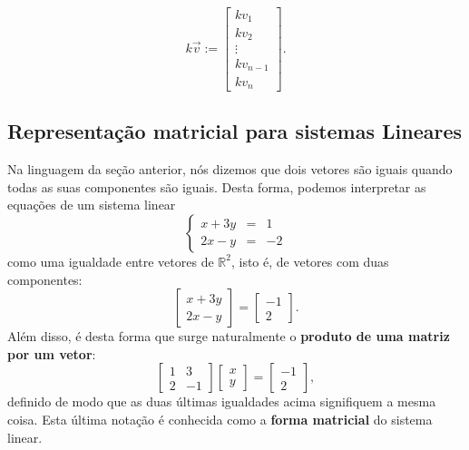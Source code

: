 \begin{equation}
k \vec{v} :=
\left[
  \begin{array}{c}
    k v_1 \\
    k v_2 \\
    \vdots \\
    k v_{n-1} \\
    k v_n
  \end{array}
\right].
\end{equation}



\subsection{Representação matricial para sistemas Lineares}

Na linguagem da seção anterior, nós dizemos que dois vetores são iguais quando todas as suas componentes são iguais. Desta forma, podemos interpretar as equações de um sistema linear
\begin{equation}
  \left\{
    \begin{array}{rcl}
      x+3y&=&1 \\
      2x-y&=&-2
    \end{array}
  \right.
\end{equation} como uma igualdade entre vetores de $\mathbb{R}^2$, isto é, de vetores com duas componentes:
\begin{equation}
  \left[
    \begin{array}{c}
      x+3y \\
      2x-y
    \end{array}
  \right] =
    \left[
    \begin{array}{c}
      -1 \\
      2
    \end{array}
  \right].
\end{equation} Além disso, é desta forma que surge naturalmente o \textbf{produto de uma matriz por um vetor}:
\begin{equation}
  \left[
    \begin{array}{cc}
      1 & 3 \\
      2 & -1
    \end{array}
  \right]
  \left[
    \begin{array}{c}
      x \\
      y
    \end{array}
  \right] =
    \left[
    \begin{array}{c}
      -1 \\
      2
    \end{array}
  \right],
\end{equation} definido de modo que as duas últimas igualdades acima signifiquem a mesma coisa. Esta última notação é conhecida como a \textbf{forma matricial} do sistema linear.





